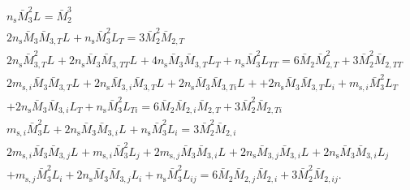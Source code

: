 \documentclass[english]{../thermomemo/thermomemo}
\newcommand{\seg}{\ensuremath{\text{s}}\xspace}
\begin{document}
\begin{gather}
  \label{eq:L_diff}
  n_{\seg} \bar{M}_{3}^2 L_{} = \bar{M}_{2}^3 \\
  2 n_{\seg} \bar{M}_{3}\bar{M}_{3,T} L_{} + n_{\seg} \bar{M}_{3}^2 L_{T} = 3 \bar{M}_{2}^2 \bar{M}_{2,T} \\
  2 n_{\seg} \bar{M}_{3,T}^2 L_{} + 2 n_{\seg} \bar{M}_{3}\bar{M}_{3,TT} L_{} + 4 n_{\seg} \bar{M}_{3}\bar{M}_{3,T} L_{T} + n_{\seg} \bar{M}_{3}^2 L_{TT} = 6 \bar{M}_{2} \bar{M}_{2,T}^2 + 3 \bar{M}_{2}^2 \bar{M}_{2,TT} \\
  2 m_{\seg,i} \bar{M}_{3}\bar{M}_{3,T} L_{}  + 2 n_{\seg} \bar{M}_{3,i}\bar{M}_{3,T} L_{} + 2 n_{\seg} \bar{M}_{3}\bar{M}_{3,Ti} L_{} + + 2 n_{\seg} \bar{M}_{3}\bar{M}_{3,T} L_{i} +  m_{\seg,i} \bar{M}_{3}^2 L_{T} \nonumber \\
  +  2 n_{\seg} \bar{M}_{3} \bar{M}_{3,i} L_{T} +  n_{\seg} \bar{M}_{3}^2 L_{Ti} = 6 \bar{M}_{2} \bar{M}_{2,i} \bar{M}_{2,T} + 3 \bar{M}_{2}^2 \bar{M}_{2,Ti} \\
  m_{\seg,i} \bar{M}_{3}^2 L_{} + 2 n_{\seg} \bar{M}_{3} \bar{M}_{3,i} L_{} + n_{\seg} \bar{M}_{3}^2 L_{i} = 3 \bar{M}_{2}^2 \bar{M}_{2,i} \\
  2 m_{\seg,i} \bar{M}_{3} \bar{M}_{3,j} L_{} + m_{\seg,i} \bar{M}_{3}^2 L_{j} + 2 m_{\seg,j} \bar{M}_{3} \bar{M}_{3,i} L_{} + 2 n_{\seg} \bar{M}_{3,j} \bar{M}_{3,i} L_{} + 2 n_{\seg} \bar{M}_{3} \bar{M}_{3,i} L_{j} \nonumber \\
  + m_{\seg,j} \bar{M}_{3}^2 L_{i} + 2 n_{\seg} \bar{M}_{3} \bar{M}_{3,j} L_{i} + n_{\seg} \bar{M}_{3}^2 L_{ij} = 6 \bar{M}_{2} \bar{M}_{2,j} \bar{M}_{2,i} + 3 \bar{M}_{2}^2 \bar{M}_{2,ij}.
\end{gather}
\end{document}
